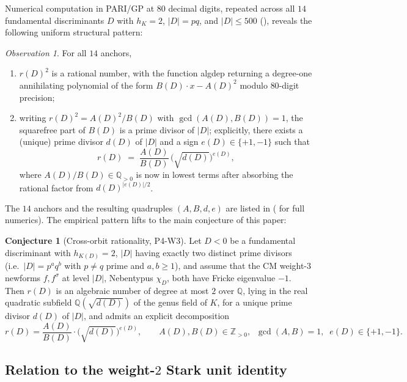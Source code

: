 \documentclass[11pt]{amsart}
\theoremstyle{definition}
\newtheorem{conjecture}[theorem]{Conjecture}
\theoremstyle{remark}
\newtheorem*{observation}{Observation}
\newcommand{\Q}{\mathbb{Q}}
\newcommand{\Z}{\mathbb{Z}}
\newcommand{\chiD}{\chi_D}
\begin{document}
Numerical computation in PARI/GP at \(80\) decimal digits, repeated
across all \(14\) fundamental discriminants \(D\) with \(h_{K} = 2\),
\(|D| = pq\), and \(|D| \le 500\) (), reveals the
following uniform structural pattern:

\begin{observation}\label{obs:main}
For all \(14\) anchors,
\begin{enumerate}
\item[(i)] \(r(D)^{2}\) is a rational number, with the function
  \textsf{algdep} returning a degree-one annihilating polynomial of
  the form \(B(D) \cdot x - A(D)^{2}\) modulo \(80\)-digit
  precision;
\item[(ii)] writing \(r(D)^{2} = A(D)^{2} / B(D)\) with
  \(\gcd(A(D), B(D)) = 1\), the squarefree part of \(B(D)\) is a prime
  divisor of \(|D|\); explicitly, there exists a (unique) prime
  divisor \(d(D)\) of \(|D|\) and a sign \(e(D) \in \{+1, -1\}\) such
  that
  \[
       r(D)
       \;=\;
       \frac{A(D)}{B(D)}\,\bigl(\sqrt{d(D)}\bigr)^{e(D)} ,
  \]
  where \(A(D)/B(D) \in \Q_{>0}\) is now in lowest terms after
  absorbing the rational factor from \(d(D)^{|e(D)|/2}\).
\end{enumerate}
\end{observation}

The \(14\) anchors and the resulting quadruples \((A, B, d, e)\) are
listed in  ( for full numerics).
The empirical pattern lifts to the main conjecture of this paper:

\begin{conjecture}[Cross-orbit rationality, P4-W3]\label{conj:main}
Let \(D < 0\) be a fundamental discriminant with \(h_{K(D)} = 2\),
\(|D|\) having exactly two distinct prime divisors (i.e.\ \(|D| = p^{a}q^{b}\)
with \(p\ne q\) prime and \(a, b \ge 1\)), and assume that the
CM weight-\(3\) newforms \(f, f^{\sigma}\) at level \(|D|\),
Nebentypus \(\chiD\), both have Fricke eigenvalue \(-1\). Then
\(r(D)\) is an algebraic number of degree at most \(2\) over \(\Q\),
lying in the real quadratic subfield \(\Q(\sqrt{d(D)})\) of the genus
field of \(K\), for a unique prime divisor \(d(D)\) of \(|D|\), and
admits an explicit decomposition
\[
   r(D) = \frac{A(D)}{B(D)} \cdot \bigl(\sqrt{d(D)}\bigr)^{e(D)} ,
   \qquad A(D), B(D) \in \Z_{>0},\;\; \gcd(A, B) = 1,
   \;\; e(D) \in \{+1, -1\}.
\]
\end{conjecture}

\subsection{Relation to the weight-\(2\) Stark unit identity}\label{ssec:cw}
\end{document}
